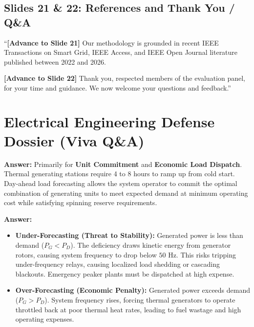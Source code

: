 \documentclass[11pt,a4paper]{article}
\begin{document}
\subsection{Slides 21 \& 22: References and Thank You / Q\&A}
\begin{scriptbox}
``\textbf{[Advance to Slide 21]} Our methodology is grounded in recent IEEE Transactions on Smart Grid, IEEE Access, and IEEE Open Journal literature published between 2022 and 2026.

\textbf{[Advance to Slide 22]} Thank you, respected members of the evaluation panel, for your time and guidance. We now welcome your questions and feedback.''
\end{scriptbox}

\newpage
\section{Electrical Engineering Defense Dossier (Viva Q\&A)}

\begin{qnabox}
\textbf{Answer:} Primarily for \textbf{Unit Commitment} and \textbf{Economic Load Dispatch}. Thermal generating stations require 4 to 8 hours to ramp up from cold start. Day-ahead load forecasting allows the system operator to commit the optimal combination of generating units to meet expected demand at minimum operating cost while satisfying spinning reserve requirements.
\end{qnabox}

\begin{qnabox}
\textbf{Answer:} 
\begin{itemize}[leftmargin=12pt,itemsep=1pt]
    \item \textbf{Under-Forecasting (Threat to Stability):} Generated power is less than demand ($P_G < P_D$). The deficiency draws kinetic energy from generator rotors, causing system frequency to drop below $50\text{ Hz}$. This risks tripping under-frequency relays, causing localized load shedding or cascading blackouts. Emergency peaker plants must be dispatched at high expense.
    \item \textbf{Over-Forecasting (Economic Penalty):} Generated power exceeds demand ($P_G > P_D$). System frequency rises, forcing thermal generators to operate throttled back at poor thermal heat rates, leading to fuel wastage and high operating expenses.
\end{itemize}
\end{qnabox}
\end{document}
